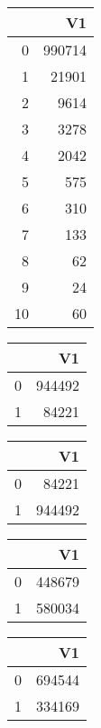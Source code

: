 \bigskip\bigskip
\centering
\begin{tabular}{rr}
  \hline
 & V1 \\ 
  \hline
0 & 990714 \\ 
  1 & 21901 \\ 
  2 & 9614 \\ 
  3 & 3278 \\ 
  4 & 2042 \\ 
  5 & 575 \\ 
  6 & 310 \\ 
  7 & 133 \\ 
  8 &  62 \\ 
  9 &  24 \\ 
  10 &  60 \\ 
   \hline
\end{tabular}

\bigskip\bigskip
\centering
\begin{tabular}{rr}
  \hline
 & V1 \\ 
  \hline
0 & 944492 \\ 
  1 & 84221 \\ 
   \hline
\end{tabular}

\bigskip\bigskip
\centering
\begin{tabular}{rr}
  \hline
 & V1 \\ 
  \hline
0 & 84221 \\ 
  1 & 944492 \\ 
   \hline
\end{tabular}

\bigskip\bigskip
\centering
\begin{tabular}{rr}
  \hline
 & V1 \\ 
  \hline
0 & 448679 \\ 
  1 & 580034 \\ 
   \hline
\end{tabular}

\bigskip\bigskip
\centering
\begin{tabular}{rr}
  \hline
 & V1 \\ 
  \hline
0 & 694544 \\ 
  1 & 334169 \\ 
   \hline
\end{tabular}

